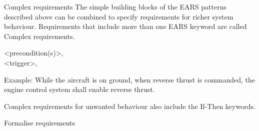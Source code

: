 \documentclass[aspectratio=169]{beamer}
\begin{document}
\begin{slide}{Complex requirements}
  The simple building blocks of the EARS patterns described above can be combined to specify requirements for richer system behaviour. Requirements that include more than one EARS keyword are called Complex requirements.
    \begin{block}{}
     \ewhile <precondition(s)>, \\
      \ewhen <trigger>, \\
        
    \end{block}
    Example: While the aircraft is on ground, when reverse thrust is commanded, the engine control system shall enable reverse thrust.

Complex requirements for unwanted behaviour also include the If-Then keywords.
\end{slide}



\begin{slide}{Formalise requirements}



\end{slide}
\end{document}
